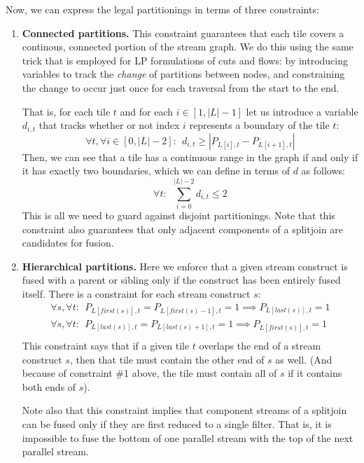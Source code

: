 \documentclass[12pt]{article}
\begin{document}
  Now, we can express the legal partitionings in terms of three
  constraints:
  \begin{enumerate}

    \item {\bf Connected partitions.}  This constraint guarantees that
    each tile covers a continous, connected portion of the stream
    graph.  We do this using the same trick that is employed for LP
    formulations of cuts and flows: by introducing variables to track
    the {\it change} of partitions between nodes, and constraining the
    change to occur just once for each traversal from the start to the
    end.

    That is, for each tile $t$ and for each $i \in [1, |L|-1]$ let us
    introduce a variable $d_{i,t}$ that tracks whether or not index
    $i$ represents a boundary of the tile $t$:
    \[
    \forall t, \forall i \in [0, |L|-2]:~~d_{i,t} \ge |P_{L[i],t} - P_{L[i+1],t}|
    \]
    Then, we can see that a tile has a continuous range in the graph
    if and only if it has exactly two boundaries, which we can define
    in terms of $d$ as follows:
    \[
    \forall t:~~\sum_{i=0}^{|L|-2} d_{i,t} \le 2
    \]
    This is all we need to guard against disjoint partitionings.  Note
    that this constraint also guarantees that only adjacent components
    of a splitjoin are candidates for fusion.

    \item {\bf Hierarchical partitions.}  Here we enforce that a given
    stream construct is fused with a parent or sibling only if the
    construct has been entirely fused itself.  There is a constraint
    for each stream construct $s$:
    \[
    \begin{array}{c}
    \forall s, \forall t:~~P_{L[first(s)],t} = P_{L[first(s)-1],t} = 1 
    \implies P_{L[last(s)],t} = 1 \\
    \forall s, \forall t:~~P_{L[last(s)],t} = P_{L[last(s)+1],t} = 1 
    \implies P_{L[first(s)],t} = 1 \\
    \end{array}
    \]
    This constraint says that if a given tile $t$ overlaps the end of
    a stream construct $s$, then that tile must contain the other end
    of $s$ as well.  (And because of constraint \#1 above, the tile
    must contain all of $s$ if it contains both ends of $s$).

    Note also that this constraint implies that component streams of a
    splitjoin can be fused only if they are first reduced to a single
    filter.  That is, it is impossible to fuse the bottom of one
    parallel stream with the top of the next parallel stream.


\end{enumerate}
\end{document}
